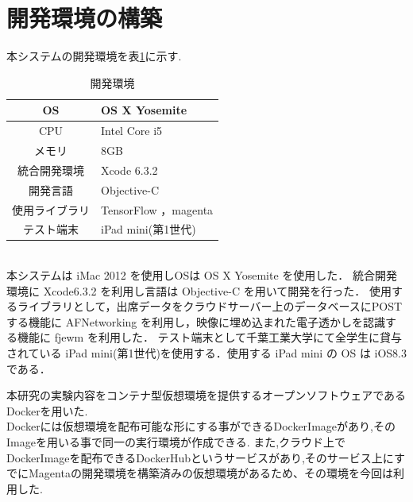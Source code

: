 \section{開発環境の構築}
本システムの開発環境を表\ref{tab:開発環境}に示す.\\
\begin{table}[h]
    \begin{center}
    \caption{開発環境}
    \label{tab:開発環境}
    \begin{tabular}{|c|p{}|}
    \hline
    OS & OS X Yosemite\\
    \hline
    CPU & Intel Core i5\\
    \hline
    メモリ & 8GB\\
    \hline
    統合開発環境 & Xcode 6.3.2\\
    \hline
    開発言語 & Objective-C\\
    \hline
    使用ライブラリ & TensorFlow ，magenta\\
    \hline
    テスト端末 & iPad mini(第1世代)\\
    \hline
    \end{tabular}
    \end{center}
\end{table}\\
本システムは iMac 2012 を使用しOSは OS X Yosemite を使用した．
統合開発環境に Xcode6.3.2 を利用し言語は Objective-C を用いて開発を行った．
使用するライブラリとして，出席データをクラウドサーバー上のデータベースにPOSTする機能に AFNetworking を利用し，映像に埋め込まれた電子透かしを認識する機能に fjewm を利用した．
テスト端末として千葉工業大学にて全学生に貸与されている iPad mini(第1世代)を使用する．使用する iPad mini の OS は iOS8.3 である．

本研究の実験内容をコンテナ型仮想環境を提供するオープンソフトウェアであるDockerを用いた.\\
Dockerには仮想環境を配布可能な形にする事ができるDockerImageがあり,そのImageを用いる事で同一の実行環境が作成できる.
また,クラウド上でDockerImageを配布できるDockerHubというサービスがあり,そのサービス上にすでにMagentaの開発環境を構築済みの仮想環境があるため、その環境を今回は利用した.